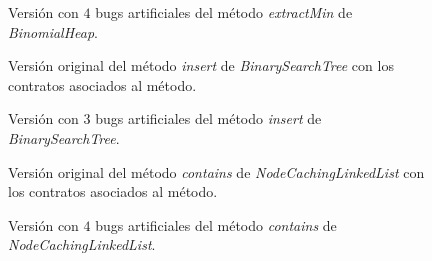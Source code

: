 \begin{figure}
	
	\caption{Versi\'on con $4$ bugs artificiales del m\'etodo \emph{extractMin} de \emph{BinomialHeap}.}
	\label{figures.code.repair.binheap_extractMin_4bugs}
\end{figure}

\begin{figure}
	
	\caption{Versi\'on original del m\'etodo \emph{insert} de \emph{BinarySearchTree} con los contratos asociados al m\'etodo.}
	\label{figures.code.repair.bintree_insert_orig}
\end{figure}

\begin{figure}
	
	\caption{Versi\'on con $3$ bugs artificiales del m\'etodo \emph{insert} de \emph{BinarySearchTree}.}
	\label{figures.code.repair.bintree_insert_3bugs}
\end{figure}

\begin{figure}
	
	\caption{Versi\'on original del m\'etodo \emph{contains} de \emph{NodeCachingLinkedList} con los contratos asociados al m\'etodo.}
	\label{figures.code.repair.ncll_contains_orig}
\end{figure}

\begin{figure}
	
	\caption{Versi\'on con $4$ bugs artificiales del m\'etodo \emph{contains} de \emph{NodeCachingLinkedList}.}
	\label{figures.code.repair.ncll_contains_4bugs}
\end{figure}